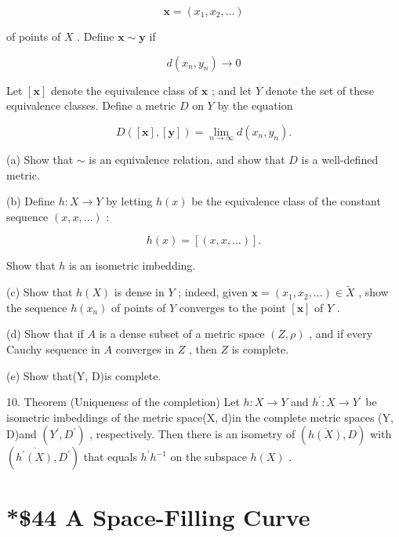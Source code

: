 \[
\mathbf{x} = \left( {{x}_{1},{x}_{2},\ldots }\right)
\]

of points of \(X\) . Define \(\mathbf{x} \sim  \mathbf{y}\) if

\[
d\left( {{x}_{n},{y}_{n}}\right)  \rightarrow  0
\]

Let \(\left\lbrack  \mathbf{x}\right\rbrack\) denote the equivalence class of \(\mathbf{x}\) ; and let \(Y\) denote the set of these equivalence classes. Define a metric \(D\) on \(Y\) by the equation

\[
D\left( {\left\lbrack  \mathbf{x}\right\rbrack  ,\left\lbrack  \mathbf{y}\right\rbrack  }\right)  = \mathop{\lim }\limits_{{n \rightarrow  \infty }}d\left( {{x}_{n},{y}_{n}}\right) .
\]

(a) Show that \(\sim\) is an equivalence relation, and show that \(D\) is a well-defined metric.

(b) Define \(h : X \rightarrow  Y\) by letting \(h\left( x\right)\) be the equivalence class of the constant sequence \(\left( {x,x,\ldots }\right)\) :

\[
h\left( x\right)  = \left\lbrack  \left( {x,x,\ldots }\right) \right\rbrack  .
\]

Show that \(h\) is an isometric imbedding.

(c) Show that \(h\left( X\right)\) is dense in \(Y\) ; indeed, given \(\mathbf{x} = \left( {{x}_{1},{x}_{2},\ldots }\right)  \in  \widetilde{X}\) , show the sequence \(h\left( {x}_{n}\right)\) of points of \(Y\) converges to the point \(\left\lbrack  \mathbf{x}\right\rbrack\) of \(Y\) .

(d) Show that if \(A\) is a dense subset of a metric space \(\left( {Z,\rho }\right)\) , and if every Cauchy sequence in \(A\) converges in \(Z\) , then \(Z\) is complete.

(e) Show that(Y, D)is complete.

10. Theorem (Uniqueness of the completion) Let \(h : X \rightarrow  Y\) and \({h}^{\prime } : X \rightarrow  {Y}^{\prime }\) be isometric imbeddings of the metric space(X, d)in the complete metric spaces (Y, D)and \(\left( {{Y}^{\prime },{D}^{\prime }}\right)\) , respectively. Then there is an isometry of \(\left( {\overline{h\left( X\right) },D}\right)\) with \(\left( {\overline{{h}^{\prime }\left( X\right) },{D}^{\prime }}\right)\) that equals \({h}^{\prime }{h}^{-1}\) on the subspace \(h\left( X\right)\) .

\section*{*\$44 A Space-Filling Curve}

